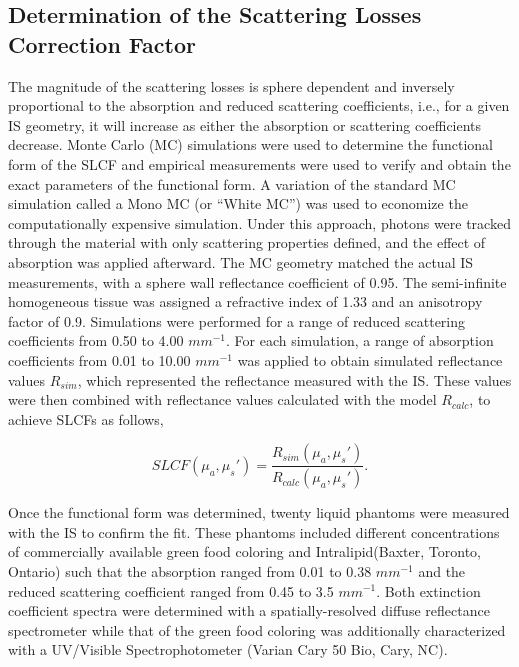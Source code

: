 \subsection{Determination of the Scattering Losses Correction Factor}
\label{sec:SLCF_methods}
The magnitude of the scattering losses is sphere dependent and inversely proportional to the absorption and reduced scattering coefficients, i.e., for a given IS geometry, it will increase as either the absorption or scattering coefficients decrease. Monte Carlo (MC) simulations were used to determine the functional form of the SLCF and empirical measurements were used to verify and obtain the exact parameters of the functional form.
A variation of the standard MC simulation called a Mono MC\cite{Kienle1996a} (or “White MC”)\cite{Alerstam2013} was used to economize the computationally expensive simulation. Under this approach, photons were tracked through the material with only scattering properties defined, and the effect of absorption was applied afterward. The MC geometry matched the actual IS measurements, with a sphere wall reflectance coefficient of 0.95. The semi-infinite homogeneous tissue was assigned a refractive index of 1.33 and an anisotropy factor of 0.9.\cite{Wang1995} Simulations were performed for a range of reduced scattering coefficients from 0.50 to 4.00 $mm^{-1}$. For each simulation, a range of absorption coefficients from 0.01 to 10.00 $mm^{-1}$ was applied to obtain simulated reflectance values $R_{sim}$, which represented the reflectance measured with the IS. These values were then combined with reflectance values calculated with the model $R_{calc}$, to achieve SLCFs as follows,

\begin{equation}
	SLCF\left(\mu_a, \mu_s'\right) = \frac{R_{sim}\left(\mu_a, \mu_s'\right)}{R_{calc}\left(\mu_a, \mu_s'\right)}.
\end{equation}

Once the functional form was determined, twenty liquid phantoms were measured with the IS to confirm the fit. These phantoms included different concentrations of commercially available green food coloring and Intralipid\textregistered (Baxter, Toronto, Ontario) such that the absorption ranged from 0.01 to 0.38 $mm^{-1}$ and the reduced scattering coefficient ranged from 0.45 to 3.5 $mm^{-1}$. Both extinction coefficient spectra were determined with a spatially-resolved diffuse reflectance spectrometer while that of the green food coloring was additionally characterized with a UV/Visible Spectrophotometer (Varian Cary 50 Bio, Cary, NC).

